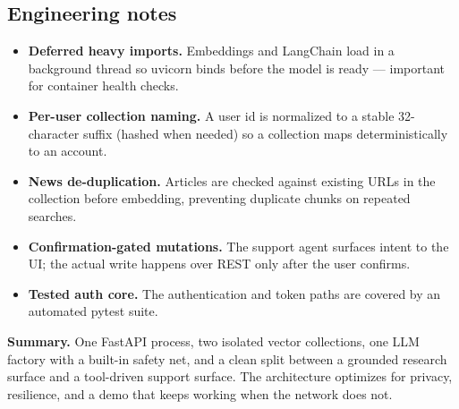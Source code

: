 \documentclass[11pt]{article}
\newcommand{\code}[1]{{\ttfamily\small #1}}
\begin{document}
\subsection{Engineering notes}
\begin{itemize}
  \item \textbf{Deferred heavy imports.} Embeddings and LangChain load in a background thread so uvicorn binds before the model is ready --- important for container health checks.
  \item \textbf{Per-user collection naming.} A user id is normalized to a stable 32-character suffix (hashed when needed) so a collection maps deterministically to an account.
  \item \textbf{News de-duplication.} Articles are checked against existing URLs in the collection before embedding, preventing duplicate chunks on repeated searches.
  \item \textbf{Confirmation-gated mutations.} The support agent surfaces intent to the UI; the actual write happens over REST only after the user confirms.
  \item \textbf{Tested auth core.} The authentication and token paths are covered by an automated \code{pytest} suite.
\end{itemize}

\vspace{2mm}
\begin{note}
\textbf{Summary.} One FastAPI process, two isolated vector collections, one LLM
factory with a built-in safety net, and a clean split between a grounded research
surface and a tool-driven support surface. The architecture optimizes for privacy,
resilience, and a demo that keeps working when the network does not.
\end{note}
\end{document}
